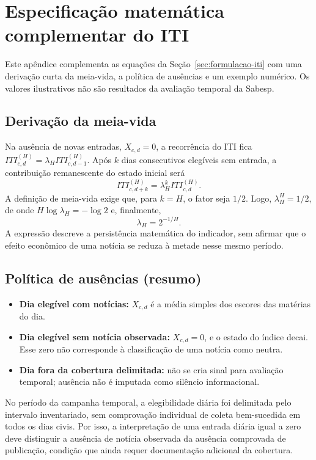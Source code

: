 \chapter{Especificação matemática complementar do ITI}
\label{ap:iti-math}

Este apêndice complementa as equações da Seção~\ref{sec:formulacao-iti} com uma derivação curta da meia-vida, a política de ausências e um exemplo numérico. Os valores ilustrativos não são resultados da avaliação temporal da Sabesp.

\section{Derivação da meia-vida}

Na ausência de novas entradas, $X_{c,d}=0$, a recorrência do ITI fica $ITI_{c,d}^{(H)}=\lambda_H ITI_{c,d-1}^{(H)}$. Após $k$ dias consecutivos elegíveis sem entrada, a contribuição remanescente do estado inicial será
\begin{equation}
    ITI_{c,d+k}^{(H)}=\lambda_H^k ITI_{c,d}^{(H)}.
\end{equation}
A definição de meia-vida exige que, para $k=H$, o fator seja $1/2$. Logo, $\lambda_H^H=1/2$, de onde $H\log\lambda_H=-\log 2$ e, finalmente,
\begin{equation}
    \lambda_H=2^{-1/H}.
\end{equation}
A expressão descreve a persistência matemática do indicador, sem afirmar que o efeito econômico de uma notícia se reduza à metade nesse mesmo período.

\section{Política de ausências (resumo)}

\begin{itemize}
    \item \textbf{Dia elegível com notícias:} $X_{c,d}$ é a média simples dos escores das matérias do dia.
    \item \textbf{Dia elegível sem notícia observada:} $X_{c,d}=0$, e o estado do índice decai. Esse zero não corresponde à classificação de uma notícia como neutra.
    \item \textbf{Dia fora da cobertura delimitada:} não se cria sinal para avaliação temporal; ausência não é imputada como silêncio informacional.
\end{itemize}

No período da campanha temporal, a elegibilidade diária foi delimitada pelo intervalo inventariado, sem comprovação individual de coleta bem-sucedida em todos os dias civis. Por isso, a interpretação de uma entrada diária igual a zero deve distinguir a ausência de notícia observada da ausência comprovada de publicação, condição que ainda requer documentação adicional da cobertura.

